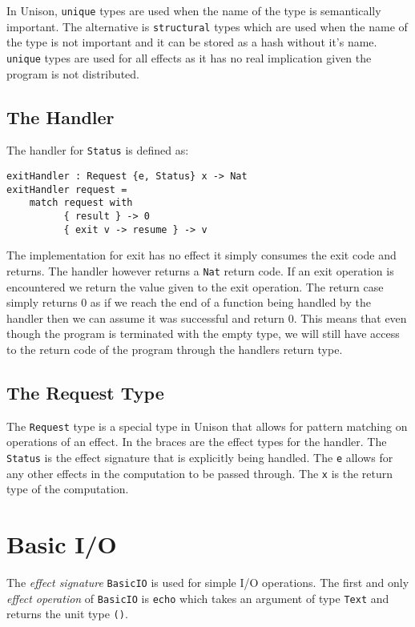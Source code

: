 \documentclass[logo,bsc,singlespacing,parskip]{infthesis}
\begin{document}
In Unison, \texttt{unique} types are used when the name of the type is
semantically important. The alternative is \texttt{structural} types which are
used when the name of the type is not important and it can be stored as a hash
without it's name. \texttt{unique} types are used for all effects as it has no
real implication given the program is not distributed.

\subsection{The Handler}

The handler for \texttt{Status} is defined as:

\begin{lstlisting}[language=unison]
exitHandler : Request {e, Status} x -> Nat
exitHandler request =
    match request with
          { result } -> 0
          { exit v -> resume } -> v
\end{lstlisting}

The implementation for exit has no effect it simply consumes the exit code and
returns. The handler however returns a \texttt{Nat} return code. If an exit
operation is encountered we return the value given to the exit operation. The
return case simply returns 0 as if we reach the end of a function being handled
by the handler then we can assume it was successful and return 0. This means
that even though the program is terminated with the empty type, we will still
have access to the return code of the program through the handlers return type.


\subsection{The Request Type}

The \texttt{Request} type is a special type in Unison that allows for pattern
matching on operations of an effect. In the braces are the effect types for the
handler. The \texttt{Status} is the effect signature that is explicitly being
handled. The \texttt{e} allows for any other effects in the computation to be
passed through. The \texttt{x} is the return type of the computation.

\section{Basic I/O}
\label{io}

The \emph{effect signature} \texttt{BasicIO} is used for simple I/O operations.
The first and only \emph{effect operation} of \texttt{BasicIO} is \texttt{echo}
which takes an argument of type \texttt{Text} and returns the unit
type \texttt{()}. 
\end{document}
